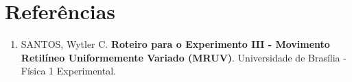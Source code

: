 \documentclass[12pt, a4paper]{article}
\begin{document}
\section*{Referências}
\begin{enumerate}
    \item SANTOS, Wytler C. \textbf{Roteiro para o Experimento III - Movimento Retilíneo Uniformemente Variado (MRUV)}. Universidade de Brasília - Física 1 Experimental.
\end{enumerate}
\end{document}
